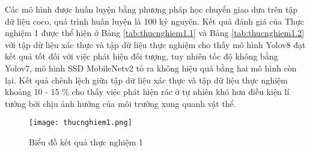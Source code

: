 \documentclass[../the.tex]{subfiles}
\begin{document}
{\fontsize{13}{12} \selectfont
    Các mô hình được huấn luyện bằng phương pháp học chuyển giao dựa trên tập dữ liệu coco, quá trình huấn luyện là 100 kỷ nguyên.
    Kết quả đánh giá của Thực nghiệm 1 được thể hiện ở Bảng \ref{tab:thucnghiem1.1} và Bảng \ref{tab:thucnghiem1.2} với tập dữ liệu xác thực và tập dữ liệu thực nghiệm cho thấy mô hình Yolov8 đạt kết quả tốt đối với việc phát hiện đối tượng,
    tuy nhiên tốc độ không bằng Yolov7, mô hình SSD MobileNetv2 tỏ ra không hiệu quả bằng hai mô hình còn lại. Kết quả chênh lệch giữa tập dữ liệu xác thực và tập dữ liệu thực nghiệm khoảng 10 - 15 \% cho thấy việc phát hiện rác ở tự nhiên khó hơn điều kiện lí tưởng bởi chịu ảnh hưởng của môi trường xung quanh vật thể.
}

\begin{figure}[H]
    \centering
    \texttt{[image: thucnghiem1.png]}
    \caption{Biểu đồ kết quả thực nghiệm 1}
    \label{fig:thucnghiem1}
\end{figure}

\bigskip
\end{document}

